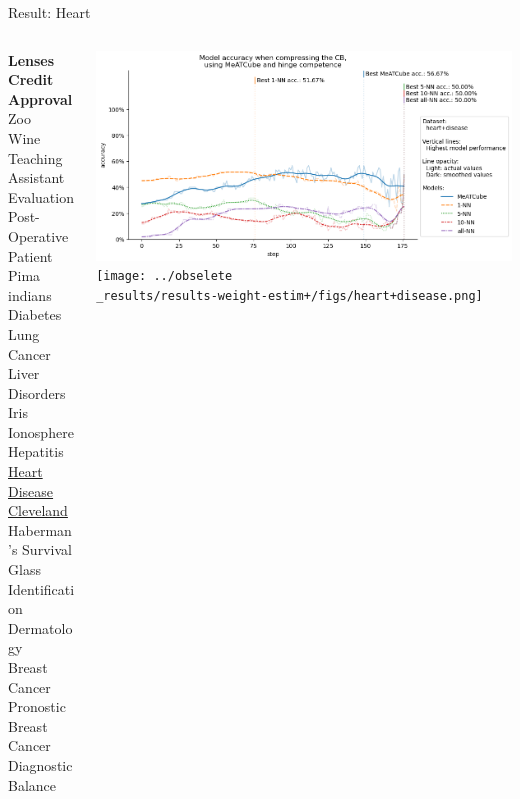 \documentclass[]{beamer}
\begin{document}
\begin{frame}{Result: Heart}
    \begin{columns}
        \begin{column}{.3\textwidth}
            {\smaller\smaller\smaller
            \textbf{Lenses} \\
            \textbf{Credit Approval} \\
            Zoo \\
            Wine \\
            Teaching Assistant Evaluation \\
            Post-Operative Patient \\
            Pima indians Diabetes \\
            Lung Cancer \\
            Liver Disorders \\
            Iris \\
            Ionosphere \\
            Hepatitis \\
            \underline{Heart Disease Cleveland} \\
            Haberman's Survival \\
            Glass Identification \\
            Dermatology \\
            Breast Cancer Pronostic \\
            Breast Cancer Diagnostic \\
            Balance\\
            ~}
        \end{column}
        \begin{column}{.7\textwidth}
            \includegraphics[width=\textwidth]{../results-no-sim-tuning+/figs/heart+disease.png}
            \texttt{[image: ../obselete\\\_results/results-weight-estim+/figs/heart+disease.png]}
        \end{column}
    \end{columns}
\end{frame}
\end{document}
